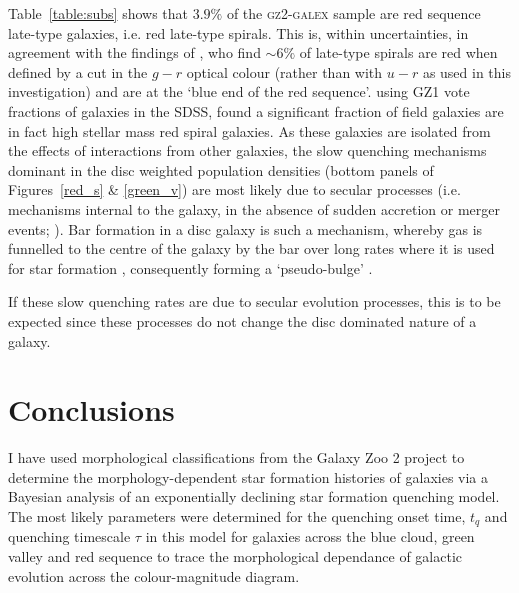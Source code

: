Table~\ref{table:subs} shows that $3.9\%$ of the \textsc{gz2-galex} sample are red sequence late-type galaxies, i.e. red late-type spirals. This is, within uncertainties, in agreement with the findings of \citet{masters10c}, who find $\sim6\%$ of late-type spirals are red when defined by a cut in the $g-r$ optical colour (rather than with $u-r$ as used in this investigation) and are at the `blue end of the red sequence'. \citet{Bamford09} using GZ1 vote fractions of galaxies in the SDSS, found a significant fraction of field galaxies are in fact high stellar mass red spiral galaxies. As these galaxies are isolated from the effects of interactions from other galaxies, the slow quenching mechanisms dominant in the disc weighted population densities (bottom panels of Figures~\ref{red_s} \& \ref{green_v}) are most likely due to secular processes (i.e. mechanisms internal to the galaxy, in the absence of sudden accretion or merger events; \citealt{kormendy04, Sheth12}). Bar formation in a disc galaxy is such a mechanism, whereby gas is funnelled to the centre of the galaxy by the bar over long rates where it is used for star formation \citep{masters12a, saintonge12, Cheung13}, consequently forming a `pseudo-bulge' \citep{Kormendy10, Simmons13}.

If these slow quenching rates are due to secular evolution processes, this is to be expected since these processes do not change the disc dominated nature of a galaxy. 

\section{Conclusions}\label{morph:conc}

I have used morphological classifications from the Galaxy Zoo 2 project to determine the morphology-dependent star formation histories of galaxies via a Bayesian analysis of an exponentially declining star formation quenching model. The most likely parameters were determined for the quenching onset time, $t_q$ and quenching timescale $\tau$ in this model for galaxies across the blue cloud, green valley and red sequence to trace the morphological dependance of galactic evolution across the colour-magnitude diagram. 

